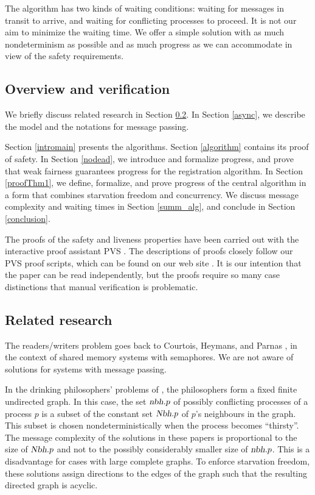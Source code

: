 \documentclass[10pt]{article} \usepackage[english]{babel}
\def\S #1/{\mbox {\textsl{#1}}}
\begin{document}
The algorithm has two kinds of waiting conditions: waiting for
messages in transit to arrive, and waiting for conflicting processes
to proceed.  It is not our aim to minimize the waiting time.  We offer
a simple solution with as much nondeterminism as possible and as much
progress as we can accommodate in view of the safety requirements.

\subsection{Overview and verification}

We briefly discuss related research in Section \ref{relatedresearch}.
In Section \ref{async}, we describe the model and the notations for
message passing. 

Section \ref{intromain} presents the algorithms.  Section
\ref{algorithm} contains its proof of safety.  In Section
\ref{nodead}, we introduce and formalize progress, and prove that weak
fairness guarantees progress for the registration algorithm.  In
Section \ref{proofThm1}, we define, formalize, and prove progress of
the central algorithm in a form that combines starvation freedom and
concurrency.  We discuss message complexity and waiting times in
Section \ref{summ_alg}, and conclude in Section \ref {conclusion}.

The proofs of the safety and liveness properties have been carried out
with the interactive proof assistant PVS \cite{OSR01}.  The
descriptions of proofs closely follow our PVS proof scripts, which can
be found on our web site \cite{whh_distrRscAlloc}.  It is our
intention that the paper can be read independently, but the proofs
require so many case distinctions that manual verification is
problematic.


\subsection{Related research} \label{relatedresearch}

The readers/writers problem \cite{And00} goes back to Courtois,
Heymans, and Parnas \cite{CHP71}, in the context of shared memory
systems with semaphores.  We are not aware of solutions for systems
with message passing.

In the drinking philosophers' problems of \cite{ChM84,Lyn96,WeL93},
the philosophers form a fixed finite undirected graph.  In this case,
the set $\S nbh/.p$ of possibly conflicting processes of a process $p$
is a subset of the constant set $\S Nbh/.p$ of $p$'s neighbours in the
graph.  This subset is chosen nondeterministically when the process
becomes ``thirsty''. The message complexity of the solutions in these
papers is proportional to the size of $\S Nbh/.p$ and not to the
possibly considerably smaller size of $\S nbh/.p$.  This is a
disadvantage for cases with large complete graphs. To enforce
starvation freedom, these solutions assign directions to the edges of
the graph such that the resulting directed graph is acyclic.
\end{document}
